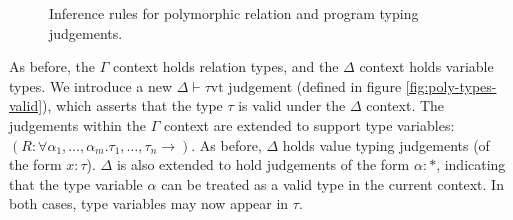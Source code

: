 \documentclass{report}
\theoremstyle{definition}
\newcommand{\wt}{\mathrel{\mathrm{wt}}}
\newcommand{\vt}{\mathrel{\mathrm{vt}}}
\begin{document}
\begin{figure}
\caption{Inference rules for polymorphic relation and program typing judgements.}
	\label{fig:poly-relation-types}
\end{figure}

As before, the \(\Gamma\) context holds relation types, and the \(\Delta\) context holds variable types.
We introduce a new \(\Delta \vdash \tau \vt\) judgement (defined in figure \ref{fig:poly-types-valid}), which asserts that the type \(\tau\) is valid under the \(\Delta\) context.
The judgements within the \(\Gamma\) context are extended to support type variables: \((R : \forall \alpha_1, \dots, \alpha_m . \tau_1,\dots,\tau_n \rightarrow)\).
As before, \(\Delta\) holds value typing judgements (of the form \(x:\tau\)). 
\(\Delta\) is also extended to hold judgements of the form \(\alpha : *\), indicating that the type variable \(\alpha\) can be treated as a valid type in the current context.
In both cases, type variables may now appear in \(\tau\).
\end{document}
